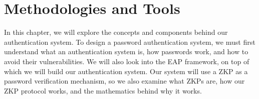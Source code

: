 \chapter{Methodologies and Tools}
\label{chapter:2}

\noindent
In this chapter, we will explore the concepts and components behind our authentication system.
To design a password authentication system, we must first understand what an authentication system is, how passwords work, and how to avoid their vulnerabilities.
We will also look into the EAP framework, on top of which we will build our authentication system.
Our system will use a ZKP as a password verification mechanism, so we also examine what ZKPs are, how our ZKP protocol works, and the mathematics behind why it works.